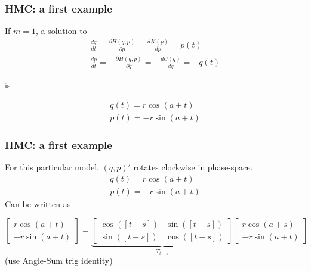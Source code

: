 \documentclass{beamer}
\begin{document}
\begin{frame}
\frametitle{HMC: a first example}

If $m=1$, a solution to
\begin{gather}
\frac{dq}{dt} = \frac{\partial H(q,p)}{\partial p} =  \frac{d K(p) }{d p} = p(t) \\
\frac{dp}{dt} = -\frac{\partial H(q,p)}{\partial q} = -\frac{d U(q)}{d q} = -q(t)
\end{gather}

is


\begin{gather}
q(t) = r \cos(a + t)\\
p(t) = -r \sin(a + t)
\end{gather}


\end{frame}

\begin{frame}
\frametitle{HMC: a first example}

For this particular model, $(q,p)'$ rotates clockwise in phase-space.
\begin{gather}
q(t) = r \cos(a + t)\\
p(t) = -r \sin(a + t)
\end{gather}
Can be written as 

$$
\left[\begin{array}{c}
r \cos(a + t) \\
-r \sin(a + t) 
\end{array}\right]
=
\underbrace{
\left[\begin{array}{cc}
\cos([t-s]) & \sin([t-s]) \\
\sin([t-s])  & \cos([t-s])
\end{array}\right]}
_{T_{t-s}}
\left[\begin{array}{c}
r \cos(a + s) \\
-r \sin(a + t) 
\end{array}\right]
$$
(use Angle-Sum trig identity)
\end{frame}
\end{document}
